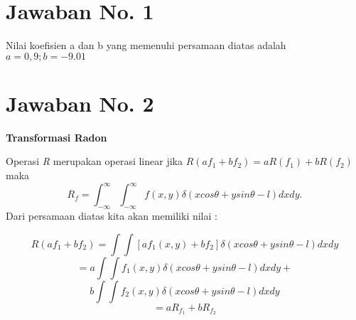 \section{Jawaban No. 1}
Nilai koefisien a dan b yang memenuhi persamaan diatas adalah $a = 0,9; b = -9.01$

\section{Jawaban No. 2}
\textbf{Transformasi Radon}
\par
Operasi \textit{R} merupakan operasi linear jika $R(af_{1} + bf_{2}) = aR(f_{1}) +  bR(f_{2})$ maka
$$R_f = \int^\infty_{-\infty} \int^\infty_{-\infty} f(x,y)\delta(x cos\theta + y sin\theta - l)dxdy.$$
Dari persamaan diatas kita akan memiliki nilai :
\par
$$R(af_{1} + bf_{2}) = \int\int[af_{1}(x,y) +  bf_{2}]\delta(x cos\theta + y sin\theta - l)dxdy$$
			$$= a \int\int f_1(x,y)\delta(x cos\theta + y sin\theta - l)dxdy +$$
			    $$b \int\int f_2(x,y)\delta(x cos\theta + y sin\theta - l)dxdy$$
			$$= aR_{f_1} +  bR_{f_2} $$

                                    

